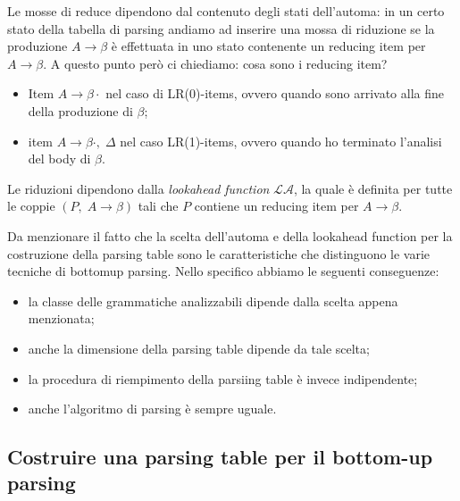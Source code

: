 \documentclass[class=book, crop=false, oneside, 12pt]{standalone}
\begin{document}
Le mosse di reduce dipendono dal contenuto degli stati dell'automa: in un certo stato della tabella di parsing andiamo ad inserire una mossa di riduzione se la produzione \(A \to \beta\) è effettuata in uno stato contenente un reducing item per \(A \to \beta\). A questo punto però ci chiediamo: cosa sono i reducing item?
\begin{itemize}
    \item Item \(A \to \beta \cdot \) nel caso di LR(0)-items, ovvero quando sono arrivato alla fine della produzione di \(\beta\);
    \item item \(A \to \beta \cdot, \; \Delta\) nel caso LR(1)-items, ovvero quando ho terminato l'analisi del body di \(\beta\).
\end{itemize}
Le riduzioni dipendono dalla \emph{lookahead function} \(\mathcal{LA}\), la quale è definita per tutte le coppie \((P,\; A \to \beta)\) tali che \(P\) contiene un reducing item per \(A \to \beta\).

Da menzionare il fatto che la scelta dell'automa e della lookahead function per la costruzione della parsing table sono le caratteristiche che distinguono le varie tecniche di bottomup parsing. Nello specifico abbiamo le seguenti conseguenze:
\begin{itemize}
    \item la classe delle grammatiche analizzabili dipende dalla scelta appena menzionata;
    \item anche la dimensione della parsing table dipende da tale scelta;
    \item la procedura di riempimento della parsiing table è invece indipendente;
    \item anche l'algoritmo di parsing è sempre uguale.
\end{itemize}

\subsection{Costruire una parsing table per il bottom-up parsing}
\end{document}
